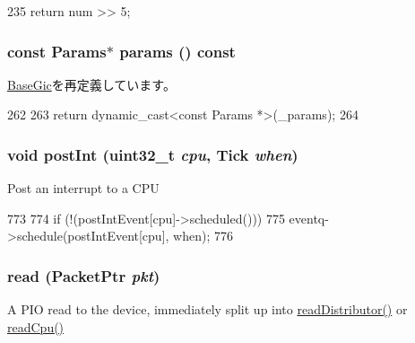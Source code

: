 \begin{DoxyCode}
235 { return num >> 5; }
\end{DoxyCode}
\hypertarget{classPl390_acd3c3feb78ae7a8f88fe0f110a718dff}{
\subsubsection[{params}]{\setlength{\rightskip}{0pt plus 5cm}const {\bf Params}$\ast$ params () const}}
\label{classPl390_acd3c3feb78ae7a8f88fe0f110a718dff}


\hyperlink{classBaseGic_ad80365b3b51c15f44416b1b835b23570}{BaseGic}を再定義しています。


\begin{DoxyCode}
262     {
263         return dynamic_cast<const Params *>(_params);
264     }
\end{DoxyCode}
\hypertarget{classPl390_a3c861ed28942d7d4b1f556c221da9e0f}{
\subsubsection[{postInt}]{\setlength{\rightskip}{0pt plus 5cm}void postInt ({\bf uint32\_\-t} {\em cpu}, \/  {\bf Tick} {\em when})}}
\label{classPl390_a3c861ed28942d7d4b1f556c221da9e0f}
Post an interrupt to a CPU 


\begin{DoxyCode}
773 {
774     if (!(postIntEvent[cpu]->scheduled()))
775         eventq->schedule(postIntEvent[cpu], when);
776 }
\end{DoxyCode}
\hypertarget{classPl390_a613ec7d5e1ec64f8d21fec78ae8e568e}{
\subsubsection[{read}]{ read ({\bf PacketPtr} {\em pkt})}}
\label{classPl390_a613ec7d5e1ec64f8d21fec78ae8e568e}
A PIO read to the device, immediately split up into \hyperlink{classPl390_a4eccad5b19d64abe6178573f999b2b3b}{readDistributor()} or \hyperlink{classPl390_a84ba155f907b634fa25ff18617946445}{readCpu()} 

